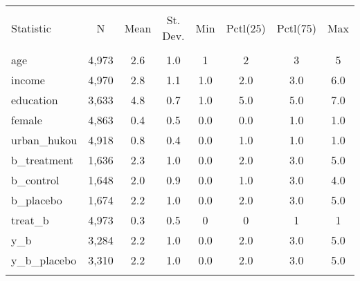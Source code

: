 
\begin{table}[!htbp] \centering 
  \caption{} 
  \label{} 
\begin{tabular}{@{\extracolsep{5pt}}lccccccc} 
\\[-1.8ex]\hline 
\hline \\[-1.8ex] 
Statistic & \multicolumn{1}{c}{N} & \multicolumn{1}{c}{Mean} & \multicolumn{1}{c}{St. Dev.} & \multicolumn{1}{c}{Min} & \multicolumn{1}{c}{Pctl(25)} & \multicolumn{1}{c}{Pctl(75)} & \multicolumn{1}{c}{Max} \\ 
\hline \\[-1.8ex] 
age & 4,973 & 2.6 & 1.0 & 1 & 2 & 3 & 5 \\ 
income & 4,970 & 2.8 & 1.1 & 1.0 & 2.0 & 3.0 & 6.0 \\ 
education & 3,633 & 4.8 & 0.7 & 1.0 & 5.0 & 5.0 & 7.0 \\ 
female & 4,863 & 0.4 & 0.5 & 0.0 & 0.0 & 1.0 & 1.0 \\ 
urban\_hukou & 4,918 & 0.8 & 0.4 & 0.0 & 1.0 & 1.0 & 1.0 \\ 
b\_treatment & 1,636 & 2.3 & 1.0 & 0.0 & 2.0 & 3.0 & 5.0 \\ 
b\_control & 1,648 & 2.0 & 0.9 & 0.0 & 1.0 & 3.0 & 4.0 \\ 
b\_placebo & 1,674 & 2.2 & 1.0 & 0.0 & 2.0 & 3.0 & 5.0 \\ 
treat\_b & 4,973 & 0.3 & 0.5 & 0 & 0 & 1 & 1 \\ 
y\_b & 3,284 & 2.2 & 1.0 & 0.0 & 2.0 & 3.0 & 5.0 \\ 
y\_b\_placebo & 3,310 & 2.2 & 1.0 & 0.0 & 2.0 & 3.0 & 5.0 \\ 
\hline \\[-1.8ex] 
\end{tabular} 
\end{table} 
